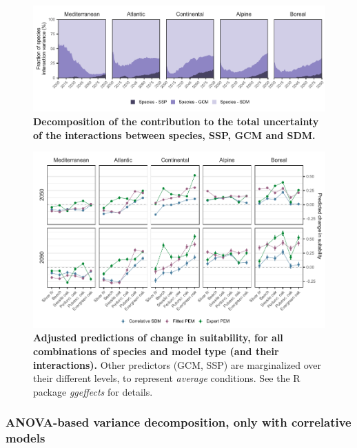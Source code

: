 
\begin{figure}[htpb]
\centering
\includegraphics{chapter4/figs/appendix_speciesinteractions2-1.pdf}
\caption{\textbf{Decomposition of the contribution to the total uncertainty of the interactions between species, SSP, GCM and SDM.}}
\label{app:specinter}
\end{figure}

\begin{figure}[htpb]
\centering
\includegraphics{chapter4/figs/appendix_speciesinteractions-1.pdf}
\caption{\textbf{Adjusted predictions of change in suitability,  for all combinations of species and model type (and their interactions).} Other predictors (GCM, SSP) are marginalized over their different levels, to represent \emph{average} conditions. See the R package \emph{ggeffects} for details.}
\label{app:spectrend}
\end{figure}

\clearpage

\subsubsection{ANOVA-based variance decomposition, only with correlative models}

